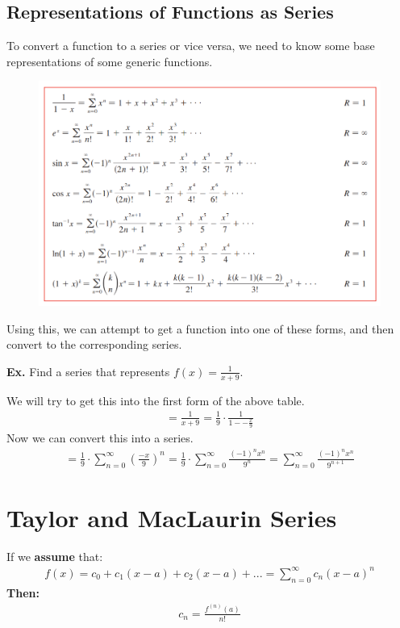 \documentclass[12pt,letterpaper]{article} \usepackage{amsmath} \usepackage{graphicx}  \usepackage{longtable}  \usepackage{amssymb}
\begin{document}
        \subsection{Representations of Functions as Series}
        To convert a function to a series or vice versa, we need to know some base representations of some generic functions. 
        \begin{figure}[H]
            \centering
            \includegraphics[width=0.9\linewidth]{seriesToFunctions.png}
        \end{figure}
        Using this, we can attempt to get a function into one of these forms, and then convert to the corresponding series. 

        \begin{mdframed}
            \textbf{Ex. } Find a series that represents $f(x) = \frac{1}{x+9}$.
            
            We will try to get this into the first form of the above table. 
            \begin{align*}
                =\frac {1}{x+9} = \frac{1}{9} \cdot \frac{1}{1-{-\frac{x}{9}}}
            \end{align*}
            Now we can convert this into a series. 
            \begin{align*}
                = \frac{1}{9} \cdot \sum_{n=0}^{\infty} \left(\frac{-x}{9}\right)^n = \frac{1}{9} \cdot \sum_{n=0}^{\infty} \frac{(-1)^n x^n}{9^n} = \sum_{n=0}^{\infty} \frac{(-1)^nx^n}{9^{n+1}}
            \end{align*}
        \end{mdframed}

    \section{Taylor and MacLaurin Series}
    If we \textbf{assume} that:
    \begin{align*}
        f(x)=c_0 + c_1 (x-a) + c_2 (x-a) + ... = \sum^{\infty}_{n=0} c_n (x-a)^n
    \end{align*}
    \textbf{Then:}
    \begin{align*}
        c_n = \frac{f^{(n)}(a)}{n!}
    \end{align*}
\end{document}

